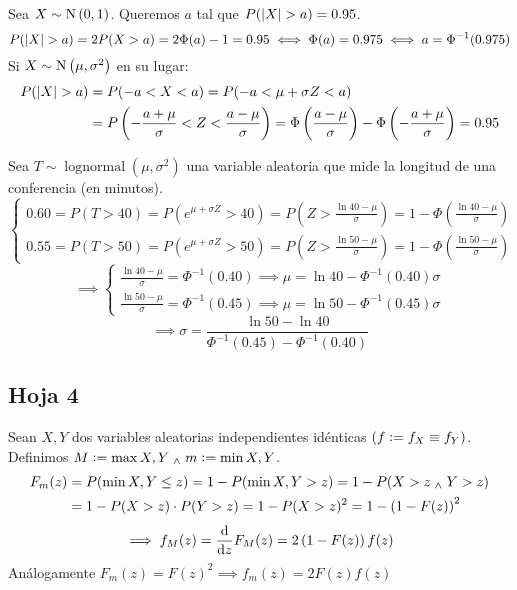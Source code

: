  Sea $X\sim\operatorname{N}\left(0,1\right)$. Queremos $a$ tal que $P(\left|X\right| > a) = 0.95$.
\[P(\left|X\right| > a) = 2P(X > a) = 2\Phi(a) -1 = 0.95 \iff \Phi(a) = 0.975 \iff a = \Phi^{-1}(0.975)\]
Si $X\sim\operatorname{N}\left(\mu, \sigma^2\right)$ en su lugar:
\[\begin{aligned}
		P(\left|X\right| > a) & = P(-a<X<a) = P(-a < \mu + \sigma Z < a)                                                                                                                 \\
		               & = P\left(-\frac{a+\mu}{\sigma} < Z < \frac{a-\mu}{\sigma}\right) = \Phi\left(\frac{a-\mu}{\sigma}\right) - \Phi\left(-\frac{a+\mu}{\sigma}\right) = 0.95
	\end{aligned}\]

 Sea $T\sim\operatorname{lognormal}(\mu, \sigma^2)$ una variable aleatoria que mide la longitud de una conferencia (en minutos).
\[\begin{cases}
		0.60 = P(T > 40) = P(e^{\mu + \sigma Z} > 40) = P\left(Z > \frac{\ln{40}-\mu}{\sigma}\right) = 1 - \Phi\left(\frac{\ln{40}-\mu}{\sigma}\right) \\
		0.55 = P(T > 50) = P(e^{\mu + \sigma Z} > 50) = P\left(Z > \frac{\ln{50}-\mu}{\sigma}\right) = 1 - \Phi\left(\frac{\ln{50}-\mu}{\sigma}\right)
	\end{cases}\]
\[\implies \begin{cases}
		\frac{\ln{40}-\mu}{\sigma} = \Phi^{-1}(0.40) \implies \mu = \ln{40} - \Phi^{-1}(0.40)\sigma \\
		\frac{\ln{50}-\mu}{\sigma} = \Phi^{-1}(0.45) \implies \mu = \ln{50} - \Phi^{-1}(0.45)\sigma
	\end{cases}\]
\[\implies \sigma = \frac{\ln{50}-\ln{40}}{\Phi^{-1}(0.45)-\Phi^{-1}(0.40)}\]

\subsection{Hoja 4}

 Sean $X, Y$ dos variables aleatorias independientes idénticas $\left(f\vcentcolon= f_X \equiv f_Y\right)$.\\
Definimos $M \vcentcolon= \max{X, Y}\; _{\wedge} \; m \vcentcolon= \min{X, Y}$.
\[\begin{aligned}
		F_m (z) & = P(\min{X, Y} \leq z) = 1- P(\min{X, Y} > z) = 1- P(X > z \; _{\wedge} \; Y > z) \\
		        & = 1- P(X>z)\cdot P(Y>z) = 1- P(X>z)^2 = 1 - \left(1- F(z)\right)^2
	\end{aligned}\]
\[\implies f_M (z) = \odv{}{z} F_M(z) = 2\left(1-F(z)\right)f(z)\]
Análogamente $F_m(z) = F(z)^2 \implies f_m(z) = 2F(z)f(z)$

